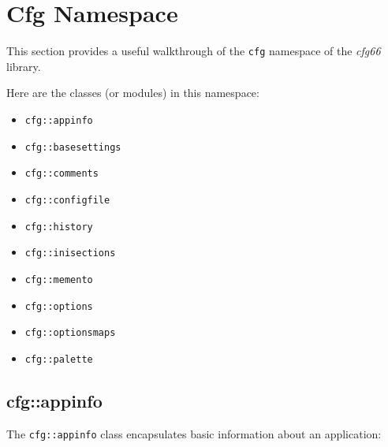 %
%
%

\section{Cfg Namespace}
\label{sec:cfg_namespace}

   This section provides a useful walkthrough of the \texttt{cfg} namespace of
   the \textsl{cfg66} library.

   Here are the classes (or modules) in this namespace:

   \begin{itemize}
      \item \texttt{cfg::appinfo}
      \item \texttt{cfg::basesettings}
      \item \texttt{cfg::comments}
      \item \texttt{cfg::configfile}
      \item \texttt{cfg::history}
      \item \texttt{cfg::inisections}
      \item \texttt{cfg::memento}
      \item \texttt{cfg::options}
      \item \texttt{cfg::optionsmaps}
      \item \texttt{cfg::palette}
   \end{itemize}

\subsection{cfg::appinfo}
\label{subsec:cfg_namespace_appinfo}

   The \texttt{cfg::appinfo} class encapsulates basic information about
   an application:

